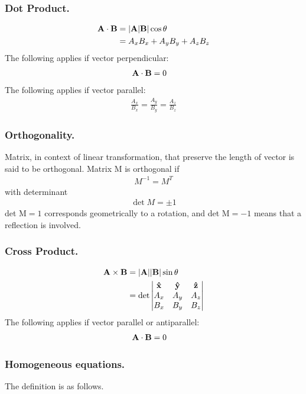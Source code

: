 \documentclass[../main.tex]{subfiles}
\begin{document}
\subsubsection{Dot Product.}
\begin{align*}
	\mathbf{A}\cdot\mathbf{B} & =|\mathbf{A}|\mathbf{B}|\cos\theta    \\
	          & =A_xB_x+A_yB_y+A_zB_z
\end{align*}
The following applies if vector perpendicular:
\begin{align*}
	\mathbf{A}\cdot\mathbf{B} & =0
\end{align*}
The following applies if vector parallel:
\begin{align*}
	\frac{A_x}{B_x}=\frac{A_y}{B_y}=\frac{A_z}{B_z}
\end{align*}

\subsubsection{Orthogonality.} 
Matrix, in context of linear transformation, that preserve the length of vector is said to be orthogonal.
Matrix M is orthogonal if
\begin{align*}
	M^{-1}=M^T
\end{align*}
with determinant
\begin{align*}
	\det M = \pm 1
\end{align*}
det $\text{M} = 1$ corresponds geometrically to a rotation, and det $\text{M} = -1$ means that a reflection is involved.

\subsubsection{Cross Product.}
\begin{align*}
	\mathbf{A}\times\mathbf{B} & =|\mathbf{A}||\mathbf{B}|\sin\theta  \\
	           & =\det\begin{vmatrix}
		                  \mathbf{\hat{x}}  & \mathbf{\hat{y}}  & \mathbf{\hat{z}}  \\
		                  A_x & A_y & A_z \\
		                  B_x & B_y & B_z
	                  \end{vmatrix}
\end{align*}
The following applies if vector parallel or antiparallel:
\begin{align*}
	\mathbf{A}\cdot\mathbf{B} & =0
\end{align*}

\subsubsection{Homogeneous equations.} 
The definition is as follows.
\end{document}

